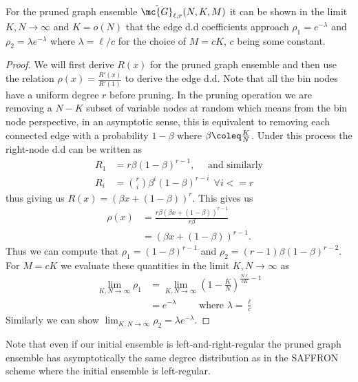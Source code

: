 \documentclass[conference,twocolumn]{IEEEtran}
\begin{document}
\begin{lemma}
\label{Lem:EdgeDDPrunedGraph}
For the pruned graph ensemble $\tilde{\mc{G}}_{\ell,r}(N,K,M)$ it can be shown in the limit $K,N\rightarrow\infty$ and $K=o(N)$ that the edge d.d coefficients approach $\rho_{1}=e^{-\lambda}$ and $\rho_{2}=\lambda e^{-\lambda}$ where $\lambda=\ell/c$ for the choice of $M=cK$, $c$ being some constant.
\end{lemma}
\begin{proof}
We will first derive $R(x)$ for the pruned graph ensemble and then use the relation $\rho(x)=\frac{R'(x)}{R'(1)}$\cite{richardson2008modern}  to derive the edge d.d. Note that all the bin nodes have a uniform degree $r$ before pruning. In the pruning operation we are removing a $N-K$ subset of variable nodes at random which means from the bin node perspective, in an asymptotic sense, this is equivalent to removing each connected edge with a probability $1-\beta$ where $\beta\coleq \frac{K}{N}$. Under this process the right-node d.d can be written as
\begin{align}
R_1&=r\beta(1-\beta)^{r-1},\quad \text{ and similarly}\label{Eqn:Deg1ChkDistribution}\\
R_i &=\binom{r}{i} \beta^{i}(1-\beta)^{r-i} ~~\forall i<=r \nonumber
\end{align}
thus giving us $R(x)=(\beta x+(1-\beta))^{r}$. This gives us 
\begin{align*}
\rho(x)&=\frac{r\beta(\beta x+(1-\beta))^{r-1}}{r\beta}\\
          &=(\beta x+(1-\beta))^{r-1}.
\end{align*}
Thus we can compute that $\rho_1=(1-\beta)^{r-1}$ and $\rho_2=(r-1)\beta(1-\beta)^{r-2}$. For $M=c K$ we evaluate these quantities in the limit $K,N\rightarrow \infty$ as
\begin{align*}
\lim_{K,N\rightarrow \infty} \rho_1&=\lim_{K,N\rightarrow \infty} \left(1-\frac{K}{N}\right)^{\frac{N\ell}{c K}-1}\\
&=e^{-\lambda} \qquad \text{ where } \lambda=\frac{\ell}{c}
\end{align*}
Similarly we can show $\lim_{K,N\rightarrow \infty}\rho_2=\lambda e^{-\lambda}$.
\end{proof}

Note that even if our initial ensemble is left-and-right-regular the pruned graph ensemble has asymptotically the same degree distribution as in the SAFFRON scheme where the initial ensemble is left-regular.
\end{document}
